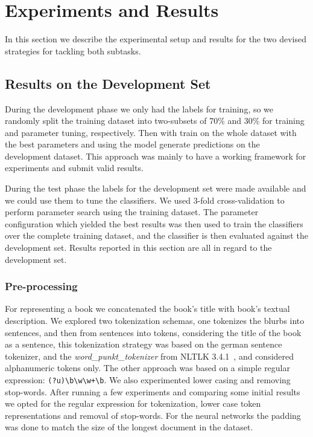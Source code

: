 \documentclass[11pt,a4paper]{article}
\begin{document}
\section{Experiments and Results}

In this section we describe the experimental setup and results for the two
devised strategies for tackling both subtasks.

\subsection{Results on the Development Set}\label{experiments}

During the development phase we only had the labels for training, so we
randomly split the training dataset into two-subsets of 70\% and 30\% for
training and parameter tuning, respectively. Then with train on the whole
dataset with the best parameters and using the model generate predictions on
the development dataset. This approach was mainly to have a working framework
for experiments and submit valid results.

During the test phase the labels for the development set were made available
and we could use them to tune the classifiers. We used 3-fold cross-validation
to perform parameter search using the training dataset. The parameter
configuration which yielded the best results was then used to train
the classifiers over the complete training dataset, and the classifier is then
evaluated against the development set. Results reported in this section
are all in regard to the development set.

\subsubsection{Pre-processing}

For representing a book we concatenated the book's title with book's textual
description. We explored two tokenization schemas, one tokenizes the blurbs into
sentences, and then from sentences into tokens, considering the title of the
book as a sentence, this tokenization strategy was based on the german sentence
tokenizer, and the \textit{word\_punkt\_tokenizer} from NLTLK 3.4.1~\cite{Bird:2009:NLP:1717171},
and considered alphanumeric tokens only. The other approach was based on a
simple regular expression: \verb|(?u)\b\w\w+\b|. We also experimented lower casing
and removing stop-words. After running a few experiments and comparing some
initial results we opted for the regular expression for tokenization, lower case
token representations and removal of stop-words. For the neural networks the
padding was done to match the size of the longest document in the dataset.
\end{document}

